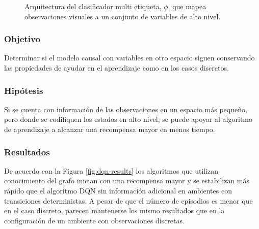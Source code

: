 \begin{itemize}
\begin{figure}
    \caption{Arquitectura del clasificador multi etiqueta, $\phi$, que
    mapea observaciones visuales a un conjunto de variables
    de alto nivel.}
    \label{fig:cnn-classifier}
\end{figure}
\end{itemize}
\subsubsection{Objetivo}

Determinar si el modelo causal con variables  en otro espacio siguen conservando las propiedades
de ayudar en el aprendizaje como en los casos discretos.

\subsubsection{Hipótesis}

Si se cuenta con información de las observaciones
en un espacio más pequeño, pero donde se codifiquen
los estados en alto nivel, se puede apoyar 
al algoritmo de aprendizaje a alcanzar una recompensa
mayor en menos tiempo.

\subsubsection{Resultados}

De acuerdo con la Figura \ref{fig:dqn-results} los algoritmos que utilizan conocimiento del grafo inician con una recompensa mayor y se estabilizan más rápido que el algoritmo DQN
sin información adicional en ambientes con transiciones deterministas. A pesar de que 
el número de episodios
es menor que en el caso 
discreto, parecen mantenerse los mismo resultados 
que en la configuración de un ambiente con observaciones
discretas.

